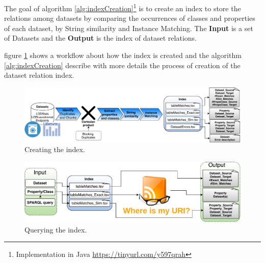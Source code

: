 The goal of algorithm \ref{alg:indexCreation}\footnote{Implementation in Java \url{https://tinyurl.com/y597qrah}} is to create an index to store the relations among datasets by comparing the occurrences of classes and properties of each dataset, by String similarity and Instance Matching. The \textbf{Input} is a set of Datasets and the \textbf{Output} is the index of dataset relations.

figure \ref{fig:create} shows a workflow about how the index is created and the algorithm \ref{alg:indexCreation} describe with more details the process of creation of the dataset relation index.

\begin{figure}[htb] 
	\centering
	\includegraphics[width=\linewidth]{img/createIndex.pdf}
	\caption{Creating the index.}
	\label{fig:create}
\end{figure}

\begin{figure}[htb] 
	\centering
	\includegraphics[width=\linewidth]{img/queryIndex.pdf}
	\caption{Querying the index.}
	\label{fig:queryIndex}
\end{figure}

